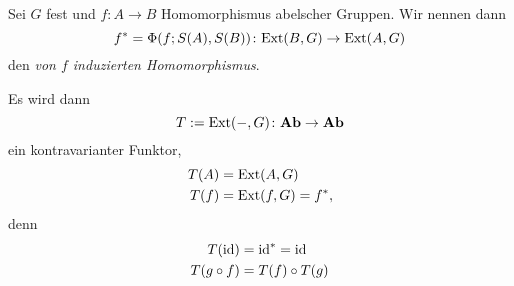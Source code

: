 \begin{defn}
  Sei $G$ fest und $f\colon A \to B$ Homomorphismus abelscher Gruppen.
  Wir nennen dann
  \begin{equation*}
    f^* = \Phi(f;S(A),S(B))\colon \mathrm{Ext}(B,G) \to \mathrm{Ext}(A,G)
  \end{equation*}
  den \emph{von $f$ induzierten Homomorphismus}.
\end{defn}
\begin{kommentar}
  Es wird dann
  \begin{equation*}
    T := \mathrm{Ext}(-,G)\colon \mathbf{Ab} \to \mathbf{Ab}
    \end{equation*}
    ein kontravarianter Funktor,
    \begin{align*}
      T(A) & = \mathrm{Ext}(A,G) \\
      T(f) & = \mathrm{Ext}(f,G) = f^*,
    \end{align*}
    denn
    \begin{align*}
      T(\operatorname{id}) & = \operatorname{id}^* = \operatorname{id} \\
      T(g \circ f) & = T(f) \circ T(g)
    \end{align*}
\end{kommentar}
